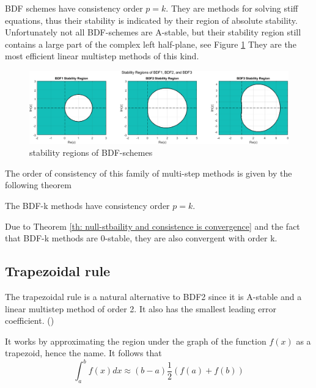 	BDF schemes have consistency order $p = k$. They are methods for solving stiff equations, thus their stability is indicated by their region of absolute stability. Unfortunately not all BDF-schemes are A-stable, but their stability region still contains a large part of the complex left half-plane, see Figure \ref{fig:screenshot020} They are the most efficient linear multistep methods of this kind.
	
	\begin{figure}[H]
		\centering
		\includegraphics[width=1\linewidth]{pictures/bdf_stability_regions.png}
		\caption{stability regions of BDF-schemes}
		\label{fig:screenshot020}
	\end{figure}

	The order of consistency of this family of multi-step methods is given by the following theorem
	
	\begin{theorem}
		The BDF-k methods have consistency order $p=k$.
	\end{theorem}
	
	Due to Theorem \ref{th: null-stbaility and consistence is convergence} and the fact that BDF-k methods are $0$-stable, they are also convergent with order k.
	
	
\subsection{Trapezoidal rule}
	\label{sec:Trapezoidal}
	
	The trapezoidal rule is a natural alternative to BDF2 since it is A-stable and a linear multistep method of order 2. It also has the smallest leading error coefficient. (\cite{ModellingAndDiscretizationOfCircuitProblems})
	
	It works by approximating the region under the graph of the function $f(x)$ as a trapezoid, hence the name. It follows that	
	\begin{displaymath}
		\int_{a}^{b} f(x) dx \approx (b-a)\frac{1}{2} (f(a)+f(b))
	\end{displaymath}
	
